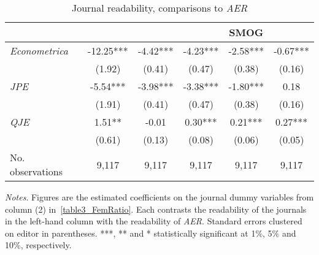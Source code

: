 \begin{table}[H]
    \footnotesize
    \centering
    \begin{threeparttable}
        \caption{Journal readability, comparisons to \textit{AER}}
        \label{table3_journal}
        \begin{tabular}{p{3cm}S@{}S@{}S@{}S@{}S@{}}
            \toprule
            &{}&{}&{}&{SMOG}&{}\\
            \midrule
            \textit{Econometrica}         &      -12.25***&       -4.42***&       -4.23***&       -2.58***&       -0.67***\\
                                          &      (1.92)   &      (0.41)   &      (0.47)   &      (0.38)   &      (0.16)   \\
            \textit{JPE}                  &       -5.54***&       -3.98***&       -3.38***&       -1.80***&        0.18   \\
                                          &      (1.91)   &      (0.41)   &      (0.47)   &      (0.38)   &      (0.16)   \\
            \textit{QJE}                  &        1.51** &       -0.01   &        0.30***&        0.21***&        0.27***\\
                                          &      (0.61)   &      (0.13)   &      (0.08)   &      (0.06)   &      (0.05)   \\
            \midrule
            No. observations              &       9,117   &       9,117   &       9,117   &       9,117   &       9,117   \\
            \bottomrule
        \end{tabular}
        \begin{tablenotes}
            \tiny
            \item \textit{Notes}. Figures are the estimated coefficients on the journal dummy variables from column (2) in~\autoref{table3_FemRatio}. Each contrasts the readability of the journals in the left-hand column with the readability of \textit{AER}. Standard errors clustered on editor in parentheses. ***, ** and * statistically significant at 1\%, 5\% and 10\%, respectively.
        \end{tablenotes}
    \end{threeparttable}
\end{table}